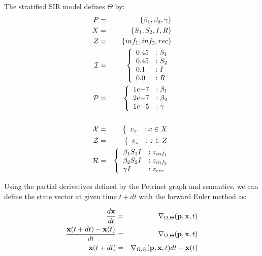 \begin{example}
    The stratified SIR model defines $\Theta$ by:
    \begin{eqnarray*}
        P &=& \{\beta_1, \beta_2, \gamma\}\\
        X &=& \{S_1, S_2, I, R\}\\
        Z &=& \{inf_1, inf_2, rec\}\\
        {\cal I} &=& \left\{ 
            \begin{array}{ll}
                0.45& :S_1\\
                0.45& :S_2\\
                0.1& :I\\
                0.0& :R
            \end{array}\right.\\
        {\cal P}&=& \left\{ 
            \begin{array}{ll}
                1e{-7}& :\beta_1\\
                2e{-7}& :\beta_2\\
                1e{-5}& :\gamma
            \end{array}\right.\\
            \\
        {\cal X} &=& \left\{ 
            \begin{array}{ll}
                v_{x} & : x \in X
            \end{array}\right.\\
        {\cal Z} &=& \left\{ 
            \begin{array}{ll}
                v_{z} & : z \in Z
            \end{array}\right.\\
        {\cal R} &=& \left\{ 
            \begin{array}{ll}
                \beta_1 S_1 I & : z_{inf_1}\\
                \beta_2 S_2 I & : z_{inf_2}\\
                \gamma I & : z_{rec}\\
            \end{array}\right.\\
    \end{eqnarray*}
\end{example}


Using the partial derivatives defined by the Petrinet graph and semantics, we
can define the state vector at given time $t+dt$ with the forward Euler method
as:

\begin{eqnarray*}
    \frac{d {\bf x}}{dt} &=& \nabla_{\Omega, \Theta}({\bf p},{\bf x}, t)\\
    \frac{{\bf x}(t+dt)-{\bf x}(t)}{dt} &=& \nabla_{\Omega, \Theta}({\bf p},{\bf x},
    t)\\
    {\bf x}(t+dt)&=& \nabla_{\Omega, \Theta}({\bf p},{\bf x}, t)dt+ {\bf x}(t)
\end{eqnarray*}

